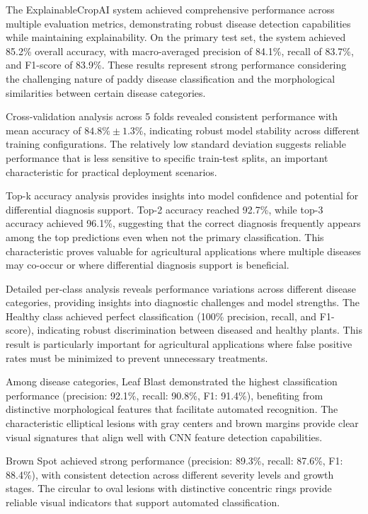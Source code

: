 \documentclass[agriculture,article,submit,pdftex,moreauthors]{Definitions/mdpi}
\begin{document}
The ExplainableCropAI system achieved comprehensive performance across multiple evaluation metrics, demonstrating robust disease detection capabilities while maintaining explainability. On the primary test set, the system achieved 85.2\% overall accuracy, with macro-averaged precision of 84.1\%, recall of 83.7\%, and F1-score of 83.9\%. These results represent strong performance considering the challenging nature of paddy disease classification and the morphological similarities between certain disease categories.

Cross-validation analysis across 5 folds revealed consistent performance with mean accuracy of $84.8\% \pm 1.3\%$, indicating robust model stability across different training configurations. The relatively low standard deviation suggests reliable performance that is less sensitive to specific train-test splits, an important characteristic for practical deployment scenarios.

Top-k accuracy analysis provides insights into model confidence and potential for differential diagnosis support. Top-2 accuracy reached 92.7\%, while top-3 accuracy achieved 96.1\%, suggesting that the correct diagnosis frequently appears among the top predictions even when not the primary classification. This characteristic proves valuable for agricultural applications where multiple diseases may co-occur or where differential diagnosis support is beneficial.


Detailed per-class analysis reveals performance variations across different disease categories, providing insights into diagnostic challenges and model strengths. The Healthy class achieved perfect classification (100\% precision, recall, and F1-score), indicating robust discrimination between diseased and healthy plants. This result is particularly important for agricultural applications where false positive rates must be minimized to prevent unnecessary treatments.

Among disease categories, Leaf Blast demonstrated the highest classification performance (precision: 92.1\%, recall: 90.8\%, F1: 91.4\%), benefiting from distinctive morphological features that facilitate automated recognition. The characteristic elliptical lesions with gray centers and brown margins provide clear visual signatures that align well with CNN feature detection capabilities.

Brown Spot achieved strong performance (precision: 89.3\%, recall: 87.6\%, F1: 88.4\%), with consistent detection across different severity levels and growth stages. The circular to oval lesions with distinctive concentric rings provide reliable visual indicators that support automated classification.
\end{document}
